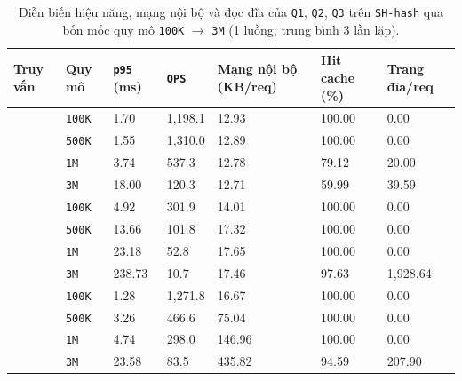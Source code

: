 \begin{table}[!htb]
\centering
\caption{Diễn biến hiệu năng, mạng nội bộ và đọc đĩa của \texttt{Q1}, \texttt{Q2}, \texttt{Q3} trên \texttt{SH-hash} qua bốn mốc quy mô \texttt{100K} $\rightarrow$ \texttt{3M} (1 luồng, trung bình 3 lần lặp).}
\label{tab:rq3-slope}
\renewcommand{\arraystretch}{1.15}
\setlength{\tabcolsep}{4.5pt}
\footnotesize
\begin{tabularx}{\linewidth}{>{\raggedright\arraybackslash}X l R{1.65cm} R{1.55cm} R{2.4cm} R{1.95cm} R{2.1cm}}
\toprule
\textbf{Truy vấn} & \textbf{Quy mô} & \textbf{\texttt{p95} (ms)} & \textbf{\texttt{QPS}} & \textbf{Mạng nội bộ (KB/req)} & \textbf{Hit cache (\%)} & \textbf{Trang đĩa/req} \\
\midrule
{} & \texttt{100K} & 1.70 & 1,198.1 & 12.93 & 100.00 & 0.00 \\
                                                  & \texttt{500K} & 1.55 & 1,310.0 & 12.89 & 100.00 & 0.00 \\
                                                  & \texttt{1M}   & 3.74 & 537.3   & 12.78 & 79.12  & 20.00 \\
                                                  & \texttt{3M}   & 18.00 & 120.3  & 12.71 & 59.99  & 39.59 \\
\midrule
{} & \texttt{100K} & 4.92 & 301.9   & 14.01 & 100.00 & 0.00 \\
                                                  & \texttt{500K} & 13.66 & 101.8  & 17.32 & 100.00 & 0.00 \\
                                                  & \texttt{1M}   & 23.18 & 52.8   & 17.65 & 100.00 & 0.00 \\
                                                  & \texttt{3M}   & 238.73 & 10.7  & 17.46 & 97.63  & 1,928.64 \\
\midrule
{} & \texttt{100K} & 1.28 & 1,271.8 & 16.67 & 100.00 & 0.00 \\
                                                  & \texttt{500K} & 3.26 & 466.6   & 75.04 & 100.00 & 0.00 \\
                                                  & \texttt{1M}   & 4.74 & 298.0   & 146.96 & 100.00 & 0.00 \\
                                                  & \texttt{3M}   & 23.58 & 83.5   & 435.82 & 94.59 & 207.90 \\
\bottomrule
\end{tabularx}
\end{table}

